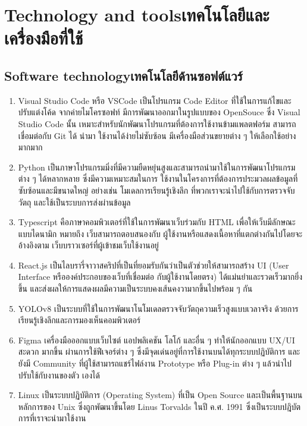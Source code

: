 \section{\ifenglish Technology and tools\else เทคโนโลยีและเครื่องมือที่ใช้\fi}


\subsection{\ifenglish Software technology\else เทคโนโลยีด้านซอฟต์แวร์\fi}

\begin{enumerate}
    \item Visual Studio Code หรือ VSCode เป็นโปรแกรม Code Editor ที่ใช้ในการแก้ไขและปรับแต่งโค้ด จากค่ายไมโครซอฟท์ 
    มีการพัฒนาออกมาในรูปแบบของ OpenSouce ซึ่ง Visual Studio Code นั้น เหมาะสําหรับนักพัฒนาโปรแกรมที่ต้องการใช้งานข้ามแพลตฟอร์ม 
    สามารถเชื่อมต่อกับ Git ได้ นํามา ใช้งานได้ง่ายไม่ซับซ้อน มีเครื่องมือส่วนขยายต่าง ๆ ให้เลือกใช้อย่างมากมาก 

    \item Python เป็นภาษาโปรแกรมมิ่งที่มีความยืดหยุ่นสูงและสามารถนำมาใช้ในการพัฒนาโปรแกรมต่าง ๆ ได้หลากหลาย ซึ่งมีความเหมาะสมในการ
    ใช้งานในโครงการที่ต้องการประมวลผลข้อมูลที่ซับซ้อนและมีขนาดใหญ่ อย่างเช่น โมเดลการเรียนรู้เชิงลึก ที่พวกเราจะนำไปใช้กับการตรวจจับวัตถุ 
    และใช้เป็นระบบการส่งผ่านข้อมูล 
    
    \item Typescript คือภาษาคอมพิวเตอร์ที่ใช้ในการพัฒนาเว็บร่วมกับ HTML เพื่อให้เว็บมีลักษณะแบบไดนามิก หมายถึง เว็บสามารถตอบสนองกับ
    ผู้ใช้งานหรือแสดงเนื้อหาที่แตกต่างกันไปโดยจะอ้างอิงตาม เว็บบราวเซอร์ที่ผู้เข้าชมเว็บใช้งานอยู่ 
    
    \item React.js เป็นไลบรารี่จาวาสคริปที่เป็นที่ยอมรับกันว่าเป็นตัวช่วยให้สามารถสร้าง UI (User Interface หรือองค์ประกอบของเว็บที่เชื่อมต่อ
    กับผู้ใช้งานโดยตรง) ได้แม่นยําและรวดเร็วมากยิ่งขึ้น และส่งผลให้การแสดงผลมีความเป็นระบบคงเส้นคงวามากขึ้นไปพร้อม ๆ กัน
    
    \item YOLOv8 เป็นระบบที่ใช้ในการพัฒนาโนโมเดลตรวจจับวัตถุความเร็วสูงแบบเวลาจริง ด้วยการเรียนรู้เชิงลึกและการมองเห็นคอมพิวเตอร์ 
    
    \item Figma เครื่องมือออกแบบเว็บไซต์ แอปพลิเคชัน โลโก้ และอื่น ๆ ทําให้นักออกแบบ UX/UI สะดวก มากขึ้น ผ่านการใช้ฟีเจอร์ต่าง ๆ 
    ซึ่งมีจุดเด่นอยู่ที่การใช้งานบนได้ทุกระบบปฏิบัติการ และยังมี Community ที่ผู้ใช้สามารถแชร์ไฟล์งาน Prototype หรือ Plug-in ต่าง ๆ 
    แล้วนําไปปรับใช้กับงานของตัว เองได้ 

    \item Linux เป็นระบบปฏิบัติการ (Operating System) ที่เป็น Open Source และเป็นพื้นฐานบนหลักการของ Unix ซึ่งถูกพัฒนาขึ้นโดย 
    Linus Torvalds ในปี ค.ศ. 1991 ซึ่งเป็นระบบปฎิบัตการที่เราจะนำมาใช้งาน 
\end{enumerate}

